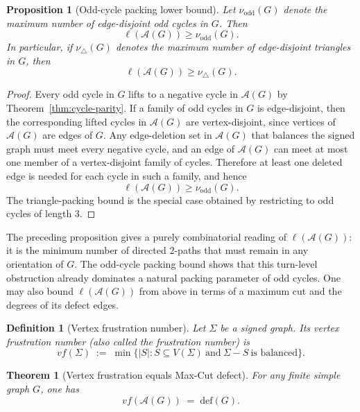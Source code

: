 \documentclass[11pt]{article}
\newtheorem{theorem}{Theorem}
\newtheorem{definition}{Definition}
\newtheorem{proposition}{Proposition}
\theoremstyle{plain}
\begin{document}
\begin{proposition}[Odd-cycle packing lower bound]
\label{prop:odd-packing-lower}
Let $\nu_{\mathrm{odd}}(G)$ denote the maximum number of edge-disjoint odd cycles
in $G$.
Then
\[
\ell(\mathcal A(G))\ge \nu_{\mathrm{odd}}(G).
\]
In particular, if $\nu_\triangle(G)$ denotes the maximum number of edge-disjoint
triangles in $G$, then
\[
\ell(\mathcal A(G))\ge \nu_\triangle(G).
\]
\end{proposition}

\begin{proof}
Every odd cycle in $G$ lifts to a negative cycle in $\mathcal A(G)$ by
Theorem~\ref{thm:cycle-parity}.
If a family of odd cycles in $G$ is edge-disjoint, then the corresponding lifted
cycles in $\mathcal A(G)$ are vertex-disjoint, since vertices of $\mathcal A(G)$
are edges of $G$.
Any edge-deletion set in $\mathcal A(G)$ that balances the signed graph must meet
every negative cycle, and an edge of $\mathcal A(G)$ can meet at most one member
of a vertex-disjoint family of cycles.
Therefore at least one deleted edge is needed for each cycle in such a family,
and hence
\[
\ell(\mathcal A(G))\ge \nu_{\mathrm{odd}}(G).
\]
The triangle-packing bound is the special case obtained by restricting to odd
cycles of length $3$.
\end{proof}

The preceding proposition gives a purely combinatorial reading of
$\ell(\mathcal A(G))$: it is the minimum number of directed $2$-paths that must
remain in any orientation of $G$.
The odd-cycle packing bound shows that this turn-level obstruction already
dominates a natural packing parameter of odd cycles.
One may also bound $\ell(\mathcal A(G))$ from above in terms of a maximum cut and
the degrees of its defect edges.


\begin{definition}[Vertex frustration number]\label{def:vertex-frustration}
Let $\Sigma$ be a signed graph. Its \emph{vertex frustration number} (also called the
\emph{frustration number}) is
\[
vf(\Sigma)\;:=\;\min\{|S|: S\subseteq V(\Sigma)\ \text{and}\ \Sigma-S\ \text{is balanced}\}.
\]
\end{definition}

\begin{theorem}[Vertex frustration equals Max-Cut defect]\label{thm:vf-equals-def}
For any finite simple graph $G$, one has
\[
vf(\mathcal A(G)) \;=\; \mathrm{def}(G).
\]
\end{theorem}
\end{document}
